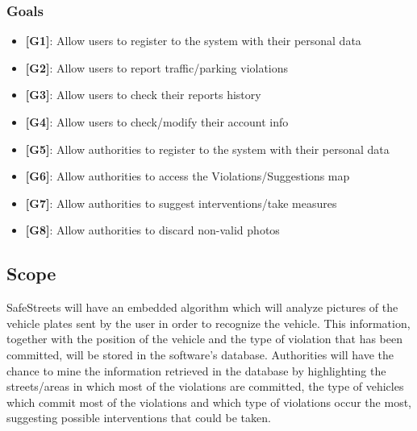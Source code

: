 \documentclass[12pt,a4paper]{article}
\begin{document}
\subsubsection{Goals}
\begin{itemize}
\item {\textbf[}\textbf{G1}{\textbf]}: Allow users to register to the system with their personal data
\item {\textbf[}\textbf{G2}{\textbf]}: Allow users to report traffic/parking violations 
\item {\textbf[}\textbf{G3}{\textbf]}: Allow users to check their reports history
\item {\textbf[}\textbf{G4}{\textbf]}: Allow users to check/modify their account info
\item {\textbf[}\textbf{G5}{\textbf]}: Allow authorities to register to the system with their personal data
\item {\textbf[}\textbf{G6}{\textbf]}: Allow authorities to access the Violations/Suggestions map
\item {\textbf[}\textbf{G7}{\textbf]}: Allow authorities to suggest interventions/take measures
\item {\textbf[}\textbf{G8}{\textbf]}: Allow authorities to discard non-valid photos
\end{itemize}
\subsection{Scope}
SafeStreets will have an embedded algorithm which will analyze pictures of the vehicle plates sent by the user in order to recognize the vehicle. This information, together with the position of the vehicle and the type of violation that has been committed, will be stored in the software's database.
\newline
Authorities will have the chance to mine the information retrieved in the database by highlighting the streets/areas in which most of the violations are committed, the type of vehicles which commit most of the violations and which type of violations occur the most, suggesting possible interventions that could be taken.	
\end{document}
